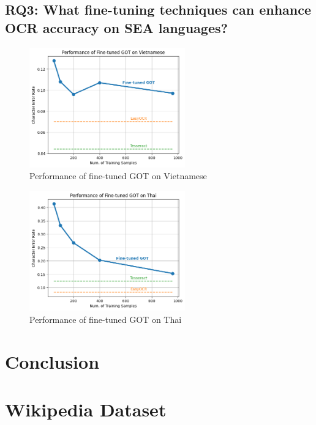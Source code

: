 \documentclass[12pt,oneside]{memoir}
\begin{document}
\section{RQ3: What fine-tuning techniques can enhance OCR accuracy on SEA languages?}

\begin{figure}[ht]
    \centering
    \includegraphics[width=0.6\textwidth]{images/fine-tuned-got-vietnamese.png}
    \caption{Performance of fine-tuned GOT on Vietnamese}
    \label{figure:fine-tuned-got-vietnamese}
\end{figure}

\begin{figure}[ht]
    \centering
    \includegraphics[width=0.6\textwidth]{images/fine-tuned-got-thai.png}
    \caption{Performance of fine-tuned GOT on Thai}
    \label{figure:fine-tuned-got-thai}
\end{figure}

\chapter{Conclusion}

\printbibliography[title={References}]

\clearpage
\appendix
\renewcommand{\chaptername}{Appendix}

\chapter{Wikipedia Dataset}
\end{document}
